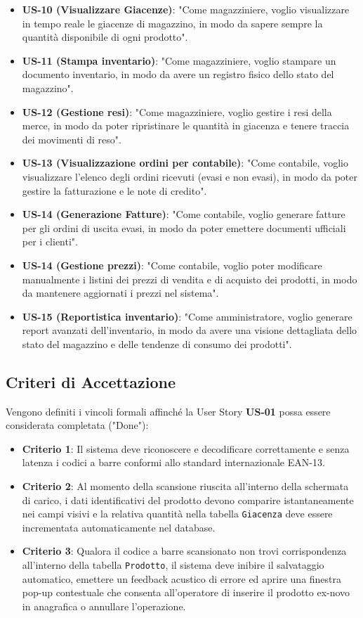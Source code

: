 \documentclass[a4paper,12pt]{article}
\begin{document}
\begin{itemize}
    \item \textbf{US-10 (Visualizzare Giacenze)}: "Come magazziniere, voglio visualizzare in tempo reale le giacenze di magazzino, in modo da sapere sempre la quantità disponibile di ogni prodotto".
    \item \textbf{US-11 (Stampa inventario)}: "Come magazziniere, voglio stampare un documento inventario, in modo da avere un registro fisico dello stato del magazzino".
    \item \textbf{US-12 (Gestione resi)}: "Come magazziniere, voglio gestire i resi della merce, in modo da poter ripristinare le quantità in giacenza e tenere traccia dei movimenti di reso".
    \item \textbf{US-13 (Visualizzazione ordini per contabile)}: "Come contabile, voglio visualizzare l'elenco degli ordini ricevuti (evasi e non evasi), in modo da poter gestire la fatturazione e le note di credito".
    \item \textbf{US-14 (Generazione Fatture)}: "Come contabile, voglio generare fatture per gli ordini di uscita evasi, in modo da poter emettere documenti ufficiali per i clienti".
    \item \textbf{US-14 (Gestione prezzi)}: "Come contabile, voglio poter modificare manualmente i listini dei prezzi di vendita e di acquisto dei prodotti, in modo da mantenere aggiornati i prezzi nel sistema".
    \item \textbf{US-15 (Reportistica inventario)}: "Come amministratore, voglio generare report avanzati dell'inventario, in modo da avere una visione dettagliata dello stato del magazzino e delle tendenze di consumo dei prodotti".
\end{itemize}

\subsection{Criteri di Accettazione}
Vengono definiti i vincoli formali affinché la User Story \textbf{US-01} possa essere considerata completata ("Done"):
\begin{itemize}
	\item \textbf{Criterio 1}: Il sistema deve riconoscere e decodificare correttamente e senza latenza i codici a barre conformi allo standard internazionale EAN-13.
	\item \textbf{Criterio 2}: Al momento della scansione riuscita all'interno della schermata di carico, i dati identificativi del prodotto devono comparire istantaneamente nei campi visivi e la relativa quantità nella tabella \texttt{Giacenza} deve essere incrementata automaticamente nel database.
	\item \textbf{Criterio 3}: Qualora il codice a barre scansionato non trovi corrispondenza all'interno della tabella \texttt{Prodotto}, il sistema deve inibire il salvataggio automatico, emettere un feedback acustico di errore ed aprire una finestra pop-up contestuale che consenta all'operatore di inserire il prodotto ex-novo in anagrafica o annullare l'operazione.
\end{itemize}
\end{document}
